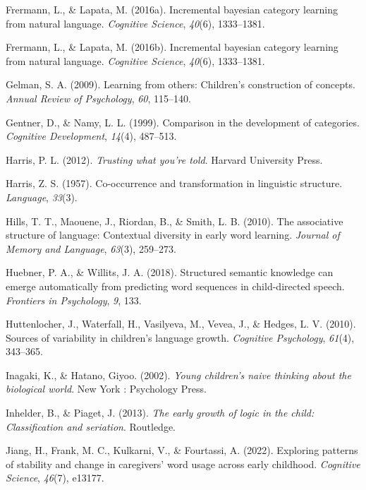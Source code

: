 \documentclass[english,,man]{apa6}
\begin{document}
\leavevmode\hypertarget{ref-frermann2016}{}%
Frermann, L., \& Lapata, M. (2016a). Incremental bayesian category learning from natural language. \emph{Cognitive Science}, \emph{40}(6), 1333--1381.

\leavevmode\hypertarget{ref-frermann2016incremental}{}%
Frermann, L., \& Lapata, M. (2016b). Incremental bayesian category learning from natural language. \emph{Cognitive Science}, \emph{40}(6), 1333--1381.

\leavevmode\hypertarget{ref-gelman2009}{}%
Gelman, S. A. (2009). Learning from others: Children's construction of concepts. \emph{Annual Review of Psychology}, \emph{60}, 115--140.

\leavevmode\hypertarget{ref-gentner1999comparison}{}%
Gentner, D., \& Namy, L. L. (1999). Comparison in the development of categories. \emph{Cognitive Development}, \emph{14}(4), 487--513.

\leavevmode\hypertarget{ref-harris2012}{}%
Harris, P. L. (2012). \emph{Trusting what you're told}. Harvard University Press.

\leavevmode\hypertarget{ref-harris1957}{}%
Harris, Z. S. (1957). Co-occurrence and transformation in linguistic structure. \emph{Language}, \emph{33}(3).

\leavevmode\hypertarget{ref-hills2010}{}%
Hills, T. T., Maouene, J., Riordan, B., \& Smith, L. B. (2010). The associative structure of language: Contextual diversity in early word learning. \emph{Journal of Memory and Language}, \emph{63}(3), 259--273.

\leavevmode\hypertarget{ref-huebner2018}{}%
Huebner, P. A., \& Willits, J. A. (2018). Structured semantic knowledge can emerge automatically from predicting word sequences in child-directed speech. \emph{Frontiers in Psychology}, \emph{9}, 133.

\leavevmode\hypertarget{ref-huttenlocher2010sources}{}%
Huttenlocher, J., Waterfall, H., Vasilyeva, M., Vevea, J., \& Hedges, L. V. (2010). Sources of variability in children's language growth. \emph{Cognitive Psychology}, \emph{61}(4), 343--365.

\leavevmode\hypertarget{ref-inagaki2002}{}%
Inagaki, K., \& Hatano, Giyoo. (2002). \emph{Young children's naive thinking about the biological world}. New York : Psychology Press.

\leavevmode\hypertarget{ref-inhelder2013}{}%
Inhelder, B., \& Piaget, J. (2013). \emph{The early growth of logic in the child: Classification and seriation}. Routledge.

\leavevmode\hypertarget{ref-jiang2022exploring}{}%
Jiang, H., Frank, M. C., Kulkarni, V., \& Fourtassi, A. (2022). Exploring patterns of stability and change in caregivers' word usage across early childhood. \emph{Cognitive Science}, \emph{46}(7), e13177.
\end{document}
